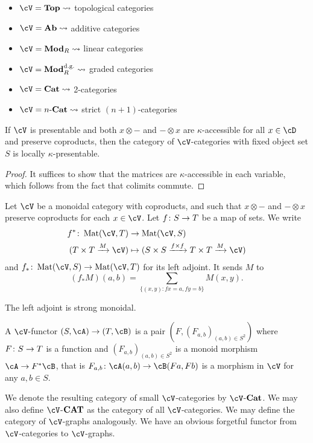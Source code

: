 \documentclass[a4paper,11pt,oneside,openany]{scrbook}
\begin{document}
\begin{exmp}
    \begin{itemize}
    \item $\cV= \Top \leadsto $ topological categories
    \item $\cV= \Ab \leadsto $ additive categories
    \item $\cV= \Mod_R \leadsto $ linear categories
    \item $\cV= \Mod_R^{\text{d.g.}} \leadsto $ graded categories
    \item $\cV= \Cat \leadsto $ 2-categories
    \item $\cV= n\text{-}\Cat \leadsto $ strict $ (n+1) $-categories
    \end{itemize}
\end{exmp}
\begin{prop}
    If $\cV$ is presentable and both $ x\otimes - $ and $ - \otimes x $ are $ \kappa $-accessible for all $ x\in \cD $ and preserve coproducts, then the category of $\cV$-categories with fixed object set $ S $ is locally $ \kappa $-presentable.
\end{prop}
\begin{proof}
    It suffices to show that the matrices are $ \kappa $-accessible in each variable, which follows from the fact that colimits commute.
\end{proof}
\begin{defn}
    Let $\cV$ be a monoidal category with coproducts, and such that $
    x\otimes - $ and $ - \otimes x $ preserve coproducts for each $ x \in\cV$.
    Let $ f \colon S \to T $ be a map of sets.
    We write
    \begin{align*}
    f^* \from \Mat(\cV ,T) & \to \Mat(\cV, S) \\
    ( T\times T \xrightarrow{M}\cV) & \mapsto ( S\times S \xrightarrow{f \times  f} T\times T \xrightarrow{M}\cV)
    \end{align*}
    and $ f_* \from \Mat(\cV,S)\to \Mat(\cV,T) $ for its left adjoint.
    It sends $ M $ to 
    \begin{displaymath}
        (f_* M)(a,b) = \sum_{\{(x,y)\colon fx = a, fy = b \} }M(x,y).
    \end{displaymath}
\end{defn}
\begin{prop}
    The left adjoint is strong monoidal.
\end{prop}
\begin{defn}
    A $\cV$-functor $ (S,\cA) \to (T,\cB) $ is a pair
    $ (F, (F_{a,b})_{(a,b) \in S^2}) $ where $ F\colon S \to T $ is a function and $ (F_{a,b})_{(a,b) \in S^2} $ is a monoid morphism $ \cA \to F^*\cB $, that is $ F_{a,b}\from \cA (a,b) \to \cB (Fa,Fb) $ is a morphism in $\cV$ for any $ a,b \in S $.

    We denote the resulting category of small $\cV$-categories by $\cV$-$ {\normalfont\textbf{Cat}} $. We may also define $\cV$-$ {\normalfont\textbf{CAT}} $ as the category of all $\cV$-categories.
    We may define the category of $\cV$-graphs analogously. We have an
    obvious forgetful functor from $\cV$-categories to $\cV$-graphs.
\end{defn}
\end{document}
